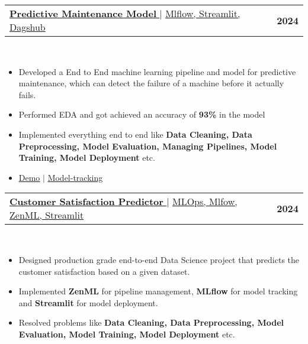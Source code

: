 \documentclass[letterpaper,11pt]{article}
\makeatletter
\newcommand{\resumeItem}[1]{
  \item\small{
    {#1 \vspace{-2pt}}
  }
}
\newcommand{\resumeProjectHeading}[2]{
    \item
    \begin{tabular*}{1.001\textwidth}{l@{\extracolsep{\fill}}r}
      \small#1 & \textbf{\small #2}\\
    \end{tabular*}\vspace{-7pt}
}
\newcommand{\resumeItemListStart}{\begin{itemize}}
\newcommand{\resumeItemListEnd}{\end{itemize}\vspace{-5pt}}
\makeatother
\begin{document}
      \resumeProjectHeading
        {\href{https://github.com/typhonshambo/End-to-End-ML-Pipeline-for-Predictive-Maintenance/tree/main}{\textbf{\large{\underline{\textbf{Predictive Maintenance Model}}}} \href{Project Link}{\raisebox{-0.1\height}\faExternalLink }} $|$ \large{\underline{Mlflow, Streamlit, Dagshub}}}{2024}\\
        \resumeItemListStart
          \resumeItem{\normalsize{Developed a End to End machine learning pipeline and model for predictive maintenance, which can detect the failure of a machine before it actually fails.}}
          \resumeItem{\normalsize{Performed EDA and got achieved an accuracy of \textbf{93\%} in the model}}
          \resumeItem{\normalsize{Implemented everything end to end like \textbf{Data Cleaning, Data Preprocessing, Model Evaluation, Managing Pipelines, Model Training, Model Deployment} etc.}}
          
          
          \resumeItem{\normalsize{\href{https://typhonshambo-predictive-maintenance.streamlit.app}{\underline{Demo}} \href{Project Link}{\raisebox{-0.1\height}\faExternalLink }} $|$ \href{https://dagshub.com/typhonshambo/End-to-End-ML-Pipeline-for-Predictive-Maintenance.mlflow}{\underline{Model-tracking}} \href{Project Link}{\raisebox{-0.1\height}\faExternalLink }}
          

        \resumeItemListEnd 
        \vspace{-13pt}
  
                  
      \resumeProjectHeading
      {\href{https://github.com/typhonshambo/customer-satisfaction-predictor}{\textbf{\large{\underline{\textbf{Customer Satisfaction Predictor}}}} \href{Project Link}{\raisebox{-0.1\height}\faExternalLink }} $|$ \large{\underline{MLOps, Mlfow, ZenML, Streamlit}}}{2024}\\
      \resumeItemListStart
        \resumeItem {\normalsize{Designed production grade end-to-end Data Science project that predicts the customer satisfaction based on a given dataset.}}
        \resumeItem{\normalsize{Implemented \textbf{ZenML} for pipeline management, \textbf{MLflow} for model tracking and \textbf{Streamlit} for model deployment.}}
        \resumeItem{\normalsize{Resolved problems like \textbf{Data Cleaning, Data Preprocessing, Model Evaluation, Model Training, Model Deployment} etc.}}
      \resumeItemListEnd 
      \vspace{-13pt}
      
\end{document}
